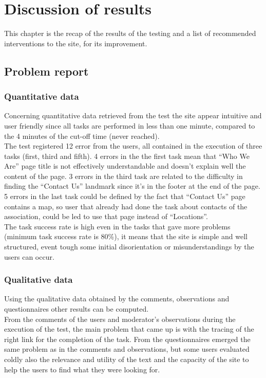 %
%
\chapter{Discussion of results}
This chapter is the recap of the results of the testing and a list of recommended interventions to the site, for its improvement.

\section{Problem report}

\subsection{Quantitative data}
Concerning quantitative data retrieved from the test the site appear intuitive and user friendly since all tasks are performed in less than one minute, compared to the 4 minutes of the cut-off time (never reached).\\
The test registered 12 error from the users, all contained in the execution of three tasks (first, third and fifth). 4 errors in the the first task mean that ``Who We Are'' page title is not effectively understandable and doesn't explain well the content of the page. 3 errors in the third task are related to the difficulty in finding the ``Contact Us'' landmark since it's in the footer at the end of the page. 5 errors in the last task could be defined by the fact that ``Contact Us'' page contains a map, so user that already had done the task about contacts of the association, could be led to use that page instead of ``Locations''.\\
The task success rate is high even in the tasks that gave more problems (minimum task success rate is 80\%), it means that the site is simple and well structured, event tough some initial disorientation or misunderstandings by the users can occur.

\subsection{Qualitative data}
Using the qualitative data obtained by the comments, observations and questionnaires other results can be computed.\\
From the comments of the users and moderator's observations during the execution of the test, the main problem that came up is with the tracing of the right link for the completion of the task.
From the questionnaires emerged the same problem as in the comments and observations, but some users evaluated coldly also the relevance and utility of the text and the capacity of the site to help the users to find what they were looking for.

